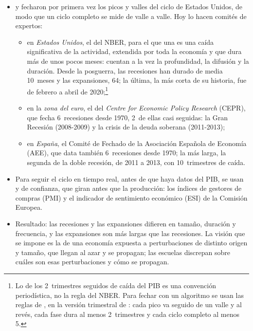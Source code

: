 \documentclass[11pt]{article}
\begin{document}
\begin{itemize}
\item {} y  fecharon por primera vez los picos y valles del ciclo de Estados Unidos, de modo que un ciclo completo se mide de valle a valle. Hoy lo hacen comités de expertos:
  \begin{itemize}
  \item en \emph{Estados Unidos}, el del NBER, para el que una  es una caída significativa de la actividad, extendida por toda la economía y que dura más de unos pocos meses: cuentan a la vez la profundidad, la difusión y la duración\nocite{NBER2026Fechado}. Desde la posguerra, las recesiones han durado de media 10~meses y las expansiones, 64; la última, la más corta de su historia, fue de febrero a abril de 2020\nocite{NBER2026Ciclos};\footnote{Lo de los 2~trimestres seguidos de caída del PIB es una convención periodística, no la regla del NBER. Para fechar con un algoritmo se usan las reglas de \textcite{BryBoschan1971}, en la versión trimestral de \textcite{HardingPagan2002Dissecting}: cada pico va seguido de un valle y al revés, cada fase dura al menos 2~trimestres y cada ciclo completo al menos 5.}
  \item en la \emph{zona del euro}, el del \emph{Centre for Economic Policy Research} (CEPR), que fecha 6~recesiones desde 1970, 2~de ellas casi seguidas: la Gran Recesión (2008-2009) y la crisis de la deuda soberana (2011-2013)\nocite{EABCN2026Cronologia};
  \item en \emph{España}, el Comité de Fechado de la Asociación Española de Economía (AEE), que data también 6~recesiones desde 1970; la más larga, la segunda de la doble recesión, de 2011 a 2013, con 10~trimestres de caída\nocite{AEE2026Fechado}.
  \end{itemize}
\item Para seguir el ciclo en tiempo real, antes de que haya datos del PIB, se usan  y de confianza, que giran antes que la producción: los índices de gestores de compras (PMI)\nocite{SPGlobalPMI} y el indicador de sentimiento económico (ESI) de la Comisión Europea\nocite{CE2025Encuestas}.
\item Resultado: las recesiones y las expansiones difieren en tamaño, duración y frecuencia, y las expansiones son más largas que las recesiones. La visión que se impone es la de una economía expuesta a perturbaciones de distinto origen y tamaño, que llegan al azar y se propagan; las escuelas discrepan sobre cuáles son esas perturbaciones y cómo se propagan.
\end{itemize}
\end{document}
